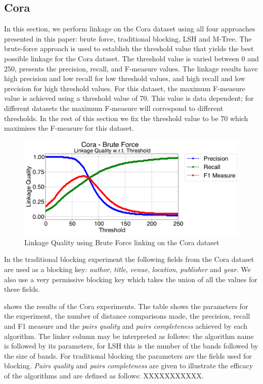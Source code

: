 \documentclass{llncs}
\begin{document}
\subsection{Cora}

In this section, we perform linkage on the Cora dataset using all four approaches presented in this paper: brute force, traditional blocking, LSH and M-Tree.
The brute-force approach is used to establish the threshold value that yields the best possible linkage for the Cora dataset. The threshold value is varied between 0 and 250,  presents the precision, recall, and F-measure values. 
The linkage results have high precision and low recall for low threshold values, and high recall and low precision for high threshold values.
For this dataset, the maximum F-measure value is achieved using a threshold value of 70. This value is data dependent; for different datasets the maximum F-measure will correspond to different thresholds. 
In the rest of this section we fix the threshold value to be 70 which maximises the F-measure for this dataset.

\begin{figure}
\includegraphics[width=\textwidth]{figures/plotLQ_--_Cora_-_Brute_Force.png}
\caption{Linkage Quality using Brute Force linking on the Cora dataset\label{fig-cora-brute}}
\end{figure}

In the traditional blocking experiment the following fields from the Cora dataset are used as a blocking key: \textit{author}, \textit{title}, \textit{venue}, \textit{location}, \textit{publisher} and \textit{year}. We also use a very permissive blocking key which takes the union of all the values for these fields. 

 shows the results of the Cora experiments. The table shows the parameters for the experiment, the number of distance comparisons made, the precision, recall and F1 measure and the \textit{pairs quality} and\textit{ pairs completeness} achieved by each algorithm.  The linker column may be interpreted as follows: the algorithm name is followed by its parameters, for LSH this is the number of the bands followed by the size of bands. For traditional blocking the parameters are the fields used for blocking. \textit{Pairs quality} and \textit{pairs completeness}  are given to illustrate the efficacy of the algorithms and are defined as follows: XXXXXXXXXXX. 
\end{document}
